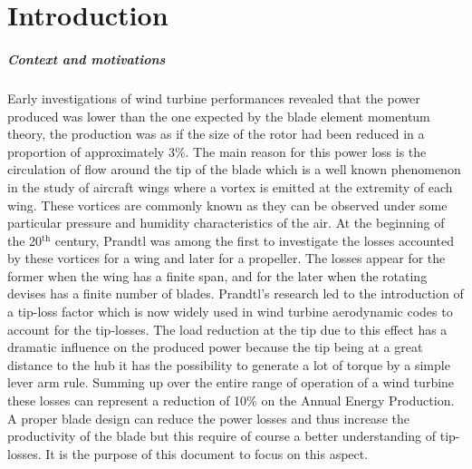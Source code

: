 \documentclass[a4paper,11pt]{book}
\begin{document}
\pagedegarde
\mytableofcontents


\chapter*{Introduction}

\paragraph{Context and motivations}
Early investigations of wind turbine performances revealed that the power produced was lower than the one expected by the blade element momentum theory, the production was as if the size of the rotor had been reduced in a proportion of approximately $3\%$. The main reason for this power loss is the circulation of flow around the tip of the blade which is a well known phenomenon in the study of aircraft wings where a vortex is emitted at the extremity of each wing. These vortices are commonly known as they can be observed under some particular pressure and humidity characteristics of the air. At the beginning of the 20$^{\text{th}}$ century, Prandtl was among the first to investigate the losses accounted by these vortices for a wing and later for a propeller. The losses appear for the former when the wing has a finite span, and for the later when the rotating devises has a finite number of blades. Prandtl's research led to the introduction of a tip-loss factor which is now widely used in wind turbine aerodynamic codes to account for the tip-losses. The load reduction at the tip due to this effect has a dramatic influence on the produced power because the tip being at a great distance to the hub it has the possibility to generate a lot of torque by a simple lever arm rule. Summing up over the entire range of operation of a wind turbine these losses can represent a reduction of 10\% on the Annual Energy Production. A proper blade design can reduce the power losses and thus increase the productivity of the blade but this require of course a better understanding of tip-losses. It is the purpose of this document to focus on this aspect.
\end{document}

